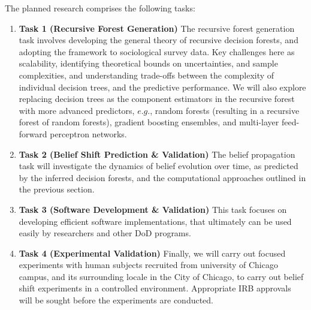 \documentclass[onecolumn, compsoc,11pt]{IEEEtran}
\newcommand{\tball}[1][CadetBlue4]{${\color{#1}\Large\boldsymbol{\blacksquare}}$}
\begin{document}
The planned research comprises the following tasks:
\begin{enumerate}
[label=\tball, leftmargin=0pt,
labelindent=0em, topsep=0.1em, labelsep=*, itemsep=.75em,itemindent=2em]\color{CadetBlue4!40!black} \sffamily\fontsize{11}{12}\selectfont
\item  \textbf{Task 1 (Recursive Forest Generation)} The recursive forest generation task involves developing the general theory of recursive decision forests, and adopting the framework to sociological survey data. Key challenges here as scalability, identifying theoretical bounds on uncertainties, and sample complexities, and understanding trade-offs between the complexity of individual decision trees, and the predictive performance. We will also explore replacing decision trees as the component estimators in the recursive forest with more advanced predictors, $e.g.$, random forests (resulting in a recursive forest of random forests), gradient boosting ensembles, and multi-layer feed-forward perceptron networks.
\item  \textbf{Task 2 (Belief Shift Prediction \& Validation)} The belief propagation task will investigate the dynamics of belief evolution over time, as predicted by the inferred decision forests, and the computational approaches outlined in the previous section. 
  \item  \textbf{Task 3 (Software Development \& Validation)} This task focuses on developing efficient software implementations, that ultimately can be used easily by researchers and other  DoD programs.
\item  \textbf{Task 4 (Experimental Validation)}
Finally, we will carry out focused experiments with human subjects recruited from university of Chicago campus, and its surrounding locale in the City of Chicago, to carry out belief shift experiments in a controlled environment. Appropriate IRB approvals will be sought before the experiments are conducted.
\end{enumerate}
\end{document}
